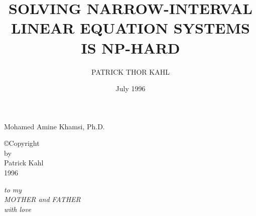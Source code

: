 \documentclass[12pt]{report}
\begin{document}

\setcounter{tocdepth}{2}


\title{SOLVING NARROW-INTERVAL LINEAR EQUATION SYSTEMS IS NP-HARD}

\author{PATRICK THOR KAHL}
\date{July 1996}

                 {Mohamed Amine Khamsi, Ph.D.}


\makesigpage

\begin{CenteredPage}
\copyright Copyright\\[0.2in]
by\\[0.2in]
Patrick Kahl\\[0.2in]
1996
\end{CenteredPage}

\begin{CenteredPage}
{\it to my\\[0.2in]
MOTHER and FATHER\\[0.2in]
with love}
\end{CenteredPage}


\end{document}
